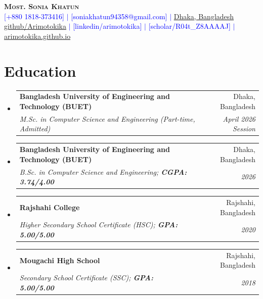 \documentclass[letterpaper,11pt]{article}
\makeatletter
\newcommand{\resumeSubheading}[4]{
  \vspace{-2pt}\item
    \begin{tabular*}{0.97\textwidth}[t]{l@{\extracolsep{\fill}}r}
      \textbf{#1} & #2 \\
      \textit{\small#3} & \textit{\small #4} \\
    \end{tabular*}\vspace{-7pt}
}
\newcommand{\resumeSubHeadingListStart}{\begin{itemize}[leftmargin=0.15in, label={}]}
\newcommand{\resumeSubHeadingListEnd}{\end{itemize}}
\makeatother
\begin{document}

\begin{center}
    \textbf{\Huge \scshape Most. Sonia Khatun} \\ \vspace{3pt}
    \small
    \textcolor{blue}{
    \faMobile \hspace{.5pt} [+880 1818-373416]
    $|$
    \faAt \hspace{.5pt} [soniakhatun94358@gmail.com]
    $|$
    \faMapMarker \hspace{.5pt} \href{https://maps.app.goo.gl/Y2rYgUQSETZuyAr7A}{Dhaka, Bangladesh}
    \\ \vspace{1pt}
    \faGithub \hspace{.5pt} \href{https://github.com/Arimotokika}{github/Arimotokika}
    $|$
    \faLinkedin \hspace{.5pt} [linkedin/arimotokika]
    $|$
    \faGraduationCap \hspace{.5pt} [scholar/R04t\_Z8AAAAJ]
    $|$
    \faGlobe \hspace{.5pt} \href{https://arimotokika.github.io/}{arimotokika.github.io}
    }
\end{center}


\section{Education}
  \vspace{2pt}
  \resumeSubHeadingListStart

    \resumeSubheading
      {Bangladesh University of Engineering and Technology (BUET)}{Dhaka, Bangladesh}
      {M.Sc. in Computer Science and Engineering (Part-time, Admitted)}{April 2026 Session}

    \resumeSubheading
      {Bangladesh University of Engineering and Technology (BUET)}{Dhaka, Bangladesh}
      {B.Sc. in Computer Science and Engineering; \textbf{CGPA: 3.74/4.00} }{2026}

    \resumeSubheading
      {Rajshahi College}{Rajshahi, Bangladesh}
      {Higher Secondary School Certificate (HSC); \textbf{GPA: 5.00/5.00}}{2020}

    \resumeSubheading
      {Mougachi High School}{Rajshahi, Bangladesh}
      {Secondary School Certificate (SSC); \textbf{GPA: 5.00/5.00}}{2018}

      
  \resumeSubHeadingListEnd
\end{document}
